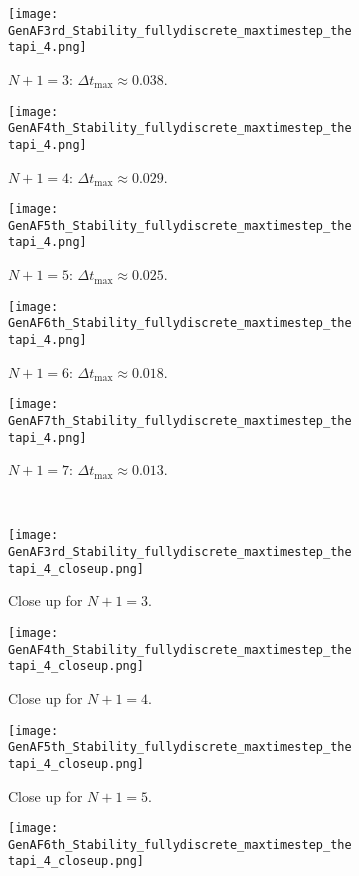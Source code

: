\documentclass[12pt,a4paper]{article}
\begin{document}
\begin{figure}
\centering
	\begin{subfigure}[b]{0.32\textwidth}
	\centering
		\texttt{[image: GenAF3rd\_Stability\_fullydiscrete\_maxtimestep\_thetapi\_4.png]}
		\caption{\(N+1 = 3\): \(\Delta t_\mathrm{max} \approx 0.038\).}
	\end{subfigure}
	\begin{subfigure}[b]{0.32\textwidth}
	\centering
		\texttt{[image: GenAF4th\_Stability\_fullydiscrete\_maxtimestep\_thetapi\_4.png]}
		\caption{\(N+1 = 4\): \(\Delta t_\mathrm{max} \approx 0.029\).}
	\end{subfigure}
	\begin{subfigure}[b]{0.32\textwidth}
	\centering
		\texttt{[image: GenAF5th\_Stability\_fullydiscrete\_maxtimestep\_thetapi\_4.png]}
		\caption{\(N+1 = 5\): \(\Delta t_\mathrm{max} \approx 0.025\).}
	\end{subfigure}
	\begin{subfigure}[b]{0.32\textwidth}
	\centering
		\texttt{[image: GenAF6th\_Stability\_fullydiscrete\_maxtimestep\_thetapi\_4.png]}
		\caption{\(N+1 = 6\): \(\Delta t_\mathrm{max} \approx 0.018\).}
	\end{subfigure}
	\begin{subfigure}[b]{0.32\textwidth}
	\centering
		\texttt{[image: GenAF7th\_Stability\_fullydiscrete\_maxtimestep\_thetapi\_4.png]}
		\caption{\(N+1 = 7\): \(\Delta t_\mathrm{max} \approx 0.013\).}
	\end{subfigure}
	\\
	\begin{subfigure}[b]{0.32\textwidth}
	\centering
		\texttt{[image: GenAF3rd\_Stability\_fullydiscrete\_maxtimestep\_thetapi\_4\_closeup.png]}
		\caption{Close up for \(N+1 = 3\).}
	\end{subfigure}
	\begin{subfigure}[b]{0.32\textwidth}
	\centering
		\texttt{[image: GenAF4th\_Stability\_fullydiscrete\_maxtimestep\_thetapi\_4\_closeup.png]}
		\caption{Close up for \(N+1 = 4\).}
	\end{subfigure}
	\begin{subfigure}[b]{0.32\textwidth}
	\centering
		\texttt{[image: GenAF5th\_Stability\_fullydiscrete\_maxtimestep\_thetapi\_4\_closeup.png]}
		\caption{Close up for \(N+1 = 5\).}
	\end{subfigure}
	\begin{subfigure}[b]{0.32\textwidth}
	\centering
		\texttt{[image: GenAF6th\_Stability\_fullydiscrete\_maxtimestep\_thetapi\_4\_closeup.png]}

\end{subfigure}
\end{figure}
\end{document}
